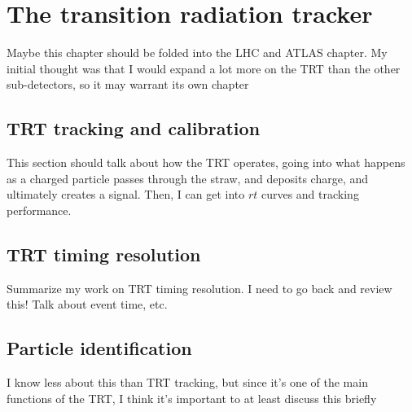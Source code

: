 \chapter[The transition radiation tracker][The transition radiation tracker]
        {The transition radiation tracker}
\label{ch:trt}

{\color{red}Maybe this chapter should be folded into the LHC and ATLAS chapter.
  My initial thought was that I would expand a lot more on the TRT than the
    other sub-detectors, so it may warrant its own chapter}

\section{TRT tracking and calibration}

{\color{red}This section should talk about how the TRT operates, going into
  what happens as a charged particle passes through the straw, and deposits
  charge, and ultimately creates a signal. Then, I can get into $rt$ curves
  and tracking performance.}

\section{TRT timing resolution}

{\color{red}Summarize my work on TRT timing resolution. I need to go back and
  review this! Talk about event time, etc.}

\section{Particle identification}

{\color{red}I know less about this than TRT tracking, but since it's one of the
  main functions of the TRT, I think it's important to at least discuss this
    briefly}
